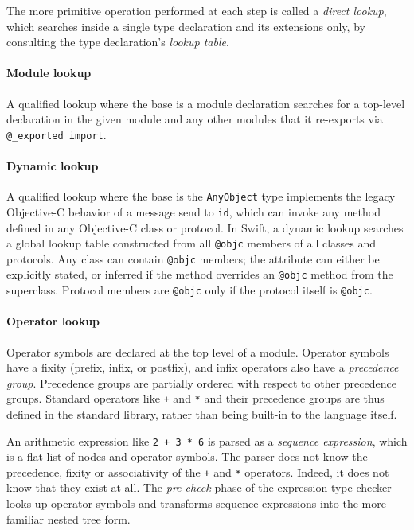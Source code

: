 \documentclass[a4paper,headsepline,bibliography=totoc,toc=flat,fleqn,twoside=semi]{scrbook}
\theoremstyle{definition}
\theoremstyle{definition}
\theoremstyle{definition}
\begin{document}
The more primitive operation performed at each step is called a \emph{direct lookup}, which searches inside a single type declaration and its extensions only, by consulting the type declaration's \emph{lookup table}.

\paragraph{Module lookup} A qualified lookup where the base is a module declaration searches for a top-level declaration in the given module and any other modules that it re-exports via \texttt{@\_exported import}.

\paragraph{Dynamic lookup} A qualified lookup where the base is the \texttt{AnyObject} type implements the legacy Objective-C behavior of a message send to \texttt{id}, which can invoke any method defined in any Objective-C class or protocol. In Swift, a dynamic lookup searches a global lookup table constructed from all \texttt{@objc} members of all classes and protocols. Any class can contain \texttt{@objc} members; the attribute can either be explicitly stated, or inferred if the method overrides an \texttt{@objc} method from the superclass. Protocol members are \texttt{@objc} only if the protocol itself is \texttt{@objc}.

\paragraph{Operator lookup}
Operator symbols are declared at the top level of a module. Operator symbols have a fixity (prefix, infix, or postfix), and infix operators also have a \emph{precedence group}. Precedence groups are partially ordered with respect to other precedence groups. Standard operators like \texttt{+} and \texttt{*} and their precedence groups are thus defined in the standard library, rather than being built-in to the language itself.

An arithmetic expression like \texttt{2 + 3 * 6} is parsed as a \emph{sequence expression}, which is a flat list of nodes and operator symbols. The parser does not know the precedence, fixity or associativity of the \texttt{+} and \texttt{*} operators. Indeed, it does not know that they exist at all. The \emph{pre-check} phase of the expression type checker looks up operator symbols and transforms sequence expressions into the more familiar nested tree form.
\end{document}
